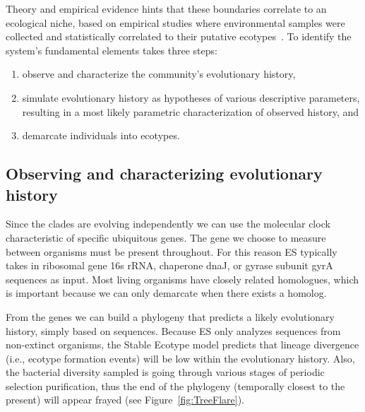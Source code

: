 Theory and empirical evidence hints that these boundaries correlate to an ecological niche, based on empirical studies where environmental samples were collected and statistically correlated to their putative ecotypes~\cite{cohan2007systematics, cohan2006sequence, ward2006cyanobacterial, cohan2006toward}.
To identify the system's fundamental elements takes three steps:
\begin{enumerate}[I]
\item observe and characterize the community's evolutionary history,
\item simulate evolutionary history as hypotheses of various descriptive parameters, resulting in a most likely parametric characterization of observed history, and
\item demarcate individuals into ecotypes.
\end{enumerate}

\subsection*{Observing and characterizing evolutionary history}
Since the clades are evolving independently we can use the molecular clock characteristic of specific ubiquitous genes.
The gene we choose to measure between organisms must be present throughout.
For this reason ES typically takes in ribosomal gene 16s rRNA, chaperone dnaJ, or gyrase subunit gyrA sequences  as input. Most living organisms have closely related homologues, which is important because we can only demarcate when there exists a homolog.

From the genes we can build a phylogeny that predicts a likely evolutionary history, simply based on sequences.
Because ES only analyzes sequences from non-extinct organisms, the Stable Ecotype model predicts that lineage divergence (i.e., ecotype formation events) will be low within the evolutionary history.
Also, the bacterial diversity sampled is going through various stages of periodic selection purification, thus the end of the phylogeny (temporally closest to the present) will appear frayed (see Figure~\ref{fig:TreeFlare}).

